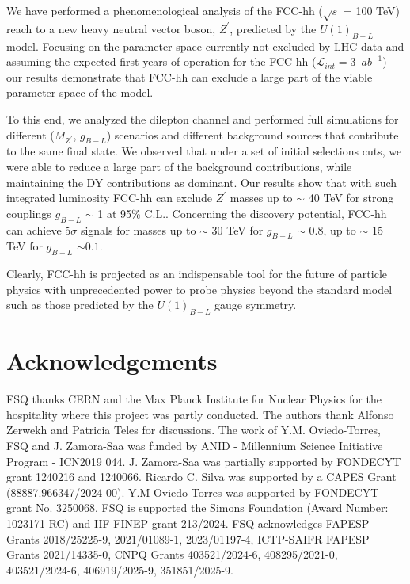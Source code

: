 \documentclass[aps,prev,twocolumn,preprintnumbers,floatfix,nofootinbib]{revtex4-1}
\begin{document}
\noindent We have performed a phenomenological analysis of the FCC-hh ($\sqrt{s}$ = 100 TeV) reach to a new heavy neutral vector boson, $Z^{\prime}$, predicted by the $U(1)_{B-L}$ model. Focusing on the parameter space currently not excluded by LHC data and assuming the expected first years of operation for the FCC-hh ($\mathcal{L}_{int} = 3$~$ab^{-1}$) our results demonstrate that FCC-hh can exclude a large part of the viable parameter space of the model. 

\noindent To this end, we analyzed the dilepton channel and performed full simulations for different ($M_{Z^{\prime}}$, $g_{B-L}$) scenarios and different background sources that contribute to the same final state. We observed that under a set of initial selections cuts, we were able to reduce a large part of the background contributions, while maintaining the DY contributions as dominant. Our results show that with such integrated luminosity FCC-hh can exclude $Z^{\prime}$ masses up to $\sim$ 40 TeV for strong couplings $g_{B-L}$ $\sim$ 1 at 95\% C.L.. Concerning the discovery potential, FCC-hh can achieve 5$\sigma$ signals for masses up to $\sim$ 30 TeV for $g_{B-L}$ $\sim$ 0.8, up to $\sim$ 15 TeV for $g_{B-L}$ $\sim 0.1$.

\noindent Clearly, FCC-hh is projected as an indispensable tool for the future of particle physics with unprecedented power to probe physics beyond the standard model such as those predicted by the $U(1)_{B-L}$ gauge symmetry.


\section*{Acknowledgements}

\noindent FSQ thanks CERN and the Max Planck Institute for Nuclear Physics for the hospitality where this project was partly conducted. The authors thank Alfonso Zerwekh and Patricia Teles for discussions. The work of Y.M. Oviedo-Torres, FSQ and J. Zamora-Saa was funded by ANID - Millennium Science Initiative Program - ICN2019 044. J. Zamora-Saa was partially supported by FONDECYT grant 1240216 and 1240066. Ricardo C. Silva was supported by a CAPES Grant (88887.966347/2024-00). Y.M Oviedo-Torres was supported by FONDECYT grant No. 3250068. FSQ is supported the Simons Foundation (Award Number: 1023171-RC) and IIF-FINEP grant 213/2024. FSQ acknowledges FAPESP Grants 2018/25225-9, 2021/01089-1, 2023/01197-4, ICTP-SAIFR FAPESP Grants 2021/14335-0, CNPQ Grants 403521/2024-6, 408295/2021-0, 403521/2024-6, 406919/2025-9, 351851/2025-9. 
\end{document}
